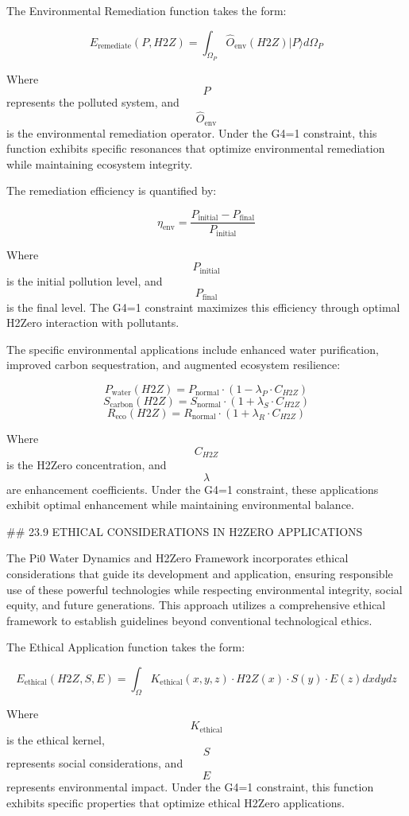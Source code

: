 The Environmental Remediation function takes the form:

$$ E_{\text{remediate}}(P, H2Z) = \int_{\Omega_P} \hat{O}_{\text{env}}(H2Z) |P\rangle d\Omega_P $$

Where $$ P $$ represents the polluted system, and $$ \hat{O}_{\text{env}} $$ is the environmental remediation operator. Under the G4=1 constraint, this function exhibits specific resonances that optimize environmental remediation while maintaining ecosystem integrity.

The remediation efficiency is quantified by:

$$ \eta_{\text{env}} = \frac{P_{\text{initial}} - P_{\text{final}}}{P_{\text{initial}}} $$

Where $$ P_{\text{initial}} $$ is the initial pollution level, and $$ P_{\text{final}} $$ is the final level. The G4=1 constraint maximizes this efficiency through optimal H2Zero interaction with pollutants.

The specific environmental applications include enhanced water purification, improved carbon sequestration, and augmented ecosystem resilience:

$$ P_{\text{water}}(H2Z) = P_{\text{normal}} \cdot (1 - \lambda_{P} \cdot C_{H2Z}) $$
$$ S_{\text{carbon}}(H2Z) = S_{\text{normal}} \cdot (1 + \lambda_{S} \cdot C_{H2Z}) $$
$$ R_{\text{eco}}(H2Z) = R_{\text{normal}} \cdot (1 + \lambda_{R} \cdot C_{H2Z}) $$

Where $$ C_{H2Z} $$ is the H2Zero concentration, and $$ \lambda $$ are enhancement coefficients. Under the G4=1 constraint, these applications exhibit optimal enhancement while maintaining environmental balance.

## 23.9 ETHICAL CONSIDERATIONS IN H2ZERO APPLICATIONS

The Pi0 Water Dynamics and H2Zero Framework incorporates ethical considerations that guide its development and application, ensuring responsible use of these powerful technologies while respecting environmental integrity, social equity, and future generations. This approach utilizes a comprehensive ethical framework to establish guidelines beyond conventional technological ethics.

The Ethical Application function takes the form:

$$ E_{\text{ethical}}(H2Z, S, E) = \int_{\Omega} K_{\text{ethical}}(x, y, z) \cdot H2Z(x) \cdot S(y) \cdot E(z) dx dy dz $$

Where $$ K_{\text{ethical}} $$ is the ethical kernel, $$ S $$ represents social considerations, and $$ E $$ represents environmental impact. Under the G4=1 constraint, this function exhibits specific properties that optimize ethical H2Zero applications.

